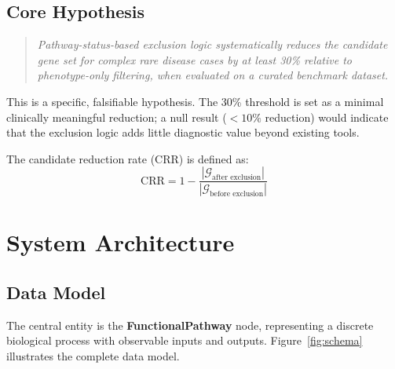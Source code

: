 \documentclass[12pt,a4paper]{article}
\begin{document}
\subsection{Core Hypothesis}

\begin{quote}
\emph{Pathway-status-based exclusion logic systematically reduces the candidate gene set for complex rare disease cases by at least 30\% relative to phenotype-only filtering, when evaluated on a curated benchmark dataset.}
\end{quote}

This is a specific, falsifiable hypothesis. The 30\% threshold is set as a minimal clinically meaningful reduction; a null result ($<10\%$ reduction) would indicate that the exclusion logic adds little diagnostic value beyond existing tools.

The candidate reduction rate (CRR) is defined as:
\begin{equation}
\label{eq:crr}
    \text{CRR} = 1 - \frac{|\mathcal{G}_{\text{after exclusion}}|}{|\mathcal{G}_{\text{before exclusion}}|}
\end{equation}

\section{System Architecture}
\label{sec:architecture}

\subsection{Data Model}
\label{sec:datamodel}

The central entity is the \textbf{FunctionalPathway} node, representing a discrete biological process with observable inputs and outputs. Figure~\ref{fig:schema} illustrates the complete data model.
\end{document}
